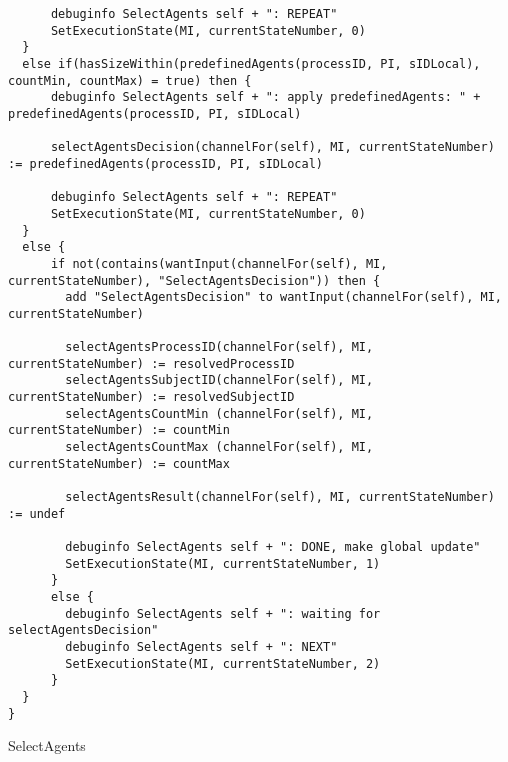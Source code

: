 \begin{listing}[H]
\begin{verbatim}
      debuginfo SelectAgents self + ": REPEAT"
      SetExecutionState(MI, currentStateNumber, 0)
  }
  else if(hasSizeWithin(predefinedAgents(processID, PI, sIDLocal), countMin, countMax) = true) then {
      debuginfo SelectAgents self + ": apply predefinedAgents: " + predefinedAgents(processID, PI, sIDLocal)

      selectAgentsDecision(channelFor(self), MI, currentStateNumber) := predefinedAgents(processID, PI, sIDLocal)

      debuginfo SelectAgents self + ": REPEAT"
      SetExecutionState(MI, currentStateNumber, 0)
  }
  else {
      if not(contains(wantInput(channelFor(self), MI, currentStateNumber), "SelectAgentsDecision")) then {
        add "SelectAgentsDecision" to wantInput(channelFor(self), MI, currentStateNumber)

        selectAgentsProcessID(channelFor(self), MI, currentStateNumber) := resolvedProcessID
        selectAgentsSubjectID(channelFor(self), MI, currentStateNumber) := resolvedSubjectID
        selectAgentsCountMin (channelFor(self), MI, currentStateNumber) := countMin
        selectAgentsCountMax (channelFor(self), MI, currentStateNumber) := countMax

        selectAgentsResult(channelFor(self), MI, currentStateNumber) := undef

        debuginfo SelectAgents self + ": DONE, make global update"
        SetExecutionState(MI, currentStateNumber, 1)
      }
      else {
        debuginfo SelectAgents self + ": waiting for selectAgentsDecision"
        debuginfo SelectAgents self + ": NEXT"
        SetExecutionState(MI, currentStateNumber, 2)
      }
  }
}
\end{verbatim}
\caption{SelectAgents}
\label{lst:asm:SelectAgents}
\end{listing}
